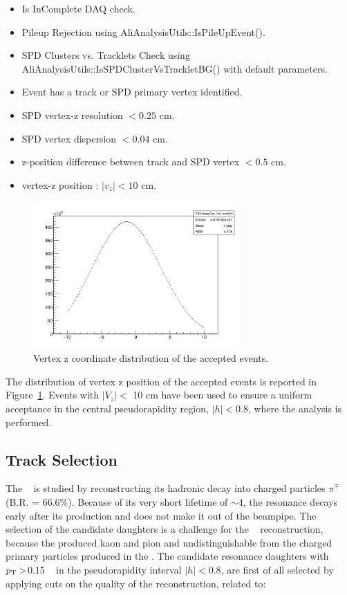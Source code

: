 \begin{itemize}
\item Is InComplete DAQ check.
\item Pileup Rejection using AliAnalysisUtils::IsPileUpEvent().
\item SPD Clusters vs. Tracklets Check using AliAnalysisUtils::IsSPDClusterVsTrackletBG() with default parameters.
\item Event has a track or SPD primary vertex identified.
\item SPD vertex-z resolution $< 0.25$ cm.
\item SPD vertex dispersion $< 0.04$ cm.
\item z-position difference between track and SPD vertex $< 0.5$ cm.
\item vertex-z position : $|v_{z}| < 10$ cm.
\end{itemize}



\begin{figure}[h!]
\centering
\includegraphics[width=0.7\textwidth]{Images/Chapter4/evt_vtx_k0.png}
\caption{Vertex z coordinate distribution of the accepted events.} 
\label{Fig:chap4-4.2}
\end{figure} 


The distribution of vertex z position of the accepted events is reported in \mbox{Figure \ref{Fig:chap4-4.2}}. Events with $|V_z| < $ 10 cm have been used to ensure a uniform acceptance in the central pseudorapidity region, $|h| < $0.8, where the analysis is performed.

\subsection{Track Selection}
\label{par:4.2a}
The \kzero~ is studied by reconstructing its hadronic decay into charged particles \kcharged $\pi^{\mp}$ (B.R. = 66.6$\%$). Because of its very short lifetime of $\sim 4$\fmc, the resonance decays early after its production and does not make it out of the beampipe. The selection of the candidate daughters is a challenge for the \kzero~ reconstruction, because the produced kaon and pion and undistinguishable from the charged primary particles produced in the .
The candidate resonance daughters with  $ p_{\mathrm{T}} > $0.15 \gmom~ in the pseudorapidity interval $|h| < 0.8$, are first of all selected by applying cuts on the quality of the reconstruction, related to:

